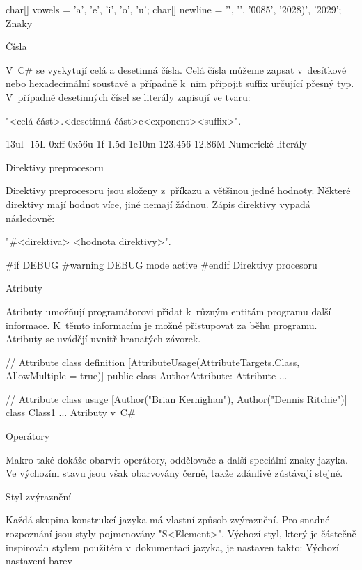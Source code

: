 \begtt
char[] vowels = {'a', 'e', 'i', 'o', 'u'};
char[] newline = {'\r', '\n', '\u0085', '\u2028)', '\u2029'};
\endtt
\priklad Znaky

\secc Čísla

V~C\# se vyskytují celá a desetinná čísla.
Celá čísla můžeme zapsat v~desítkové nebo hexadecimální soustavě a případně k~nim připojit suffix určující přesný typ.
V~případně desetinných čísel se literály zapisují ve tvaru:

"<celá část>.<desetinná část>e<exponent><suffix>".

         13ul         -15L       0xff         0x56u
    1f         1.5d        1e10m    123.456        12.86M
\endtt
\priklad Numerické literály

\sec Direktivy preprocesoru

Direktivy preprocesoru jsou složeny z~příkazu a většinou jedné hodnoty.
Některé direktivy mají hodnot více, jiné nemají žádnou.
Zápis direktivy vypadá následovně:

"#<direktiva> <hodnota direktivy>".

\begtt
#if DEBUG
#warning DEBUG mode active
#endif
\endtt
\priklad Direktivy procesoru

\sec Atributy

Atributy umožňují programátorovi přidat k~různým entitám programu další informace.
K~těmto informacím je možné přistupovat za běhu programu.
Atributy se uvádějí uvnitř hranatých závorek.

\begtt
// Attribute class definition
[AttributeUsage(AttributeTargets.Class, AllowMultiple = true)]
public class AuthorAttribute: Attribute
{ ... }

// Attribute class usage
[Author("Brian Kernighan"), Author("Dennis Ritchie")]
class Class1
{ ... }
\endtt
\priklad Atributy v~C\#

\sec Operátory

Makro také dokáže obarvit operátory, oddělovače a další speciální znaky jazyka.
Ve výchozím stavu jsou však obarvovány černě, takže zdánlivě zůstávají stejné.

\chap Styl zvýraznění

Každá skupina konstrukcí jazyka má vlastní způsob zvýraznění.
Pro snadné rozpoznání jsou styly pojmenovány "S<Element>".
Výchozí styl, který je částečně inspirován stylem použitém v~dokumentaci jazyka, je nastaven takto:
\midinsert
{}
\begtt
\let\SComment=\Green      %
\let\SDocComment=\Grey    %
\let\SPreprocKW=\Magenta  %
\let\SPreprocVal=\Magenta %
\let\SKeyword=\Blue       %
\let\SAttribute=\Cyan     %
\let\SLiteral=\Cyan       %
\let\SString=\Red         %
\let\SChar=\Red           %
\let\SNumber=\Black       %
\let\SOper=\Black         %
\endtt
\priklad Výchozí nastavení barev
\endinsert

